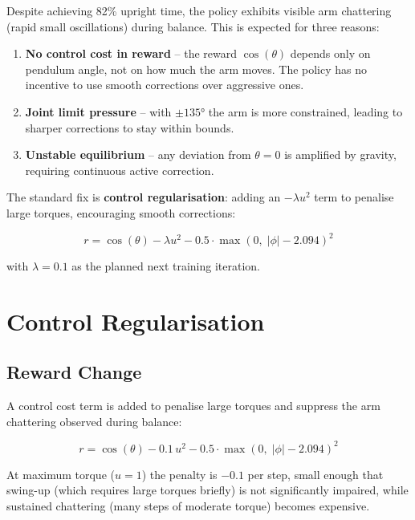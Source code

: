 \documentclass[12pt,a4paper]{article}
\begin{document}
Despite achieving 82\% upright time, the policy exhibits visible arm chattering
(rapid small oscillations) during balance. This is expected for three reasons:

\begin{enumerate}
    \item \textbf{No control cost in reward} -- the reward $\cos(\theta)$
          depends only on pendulum angle, not on how much the arm moves.
          The policy has no incentive to use smooth corrections over aggressive ones.
    \item \textbf{Joint limit pressure} -- with $\pm135°$ the arm is more
          constrained, leading to sharper corrections to stay within bounds.
    \item \textbf{Unstable equilibrium} -- any deviation from $\theta=0$
          is amplified by gravity, requiring continuous active correction.
\end{enumerate}

\noindent The standard fix is \textbf{control regularisation}: adding an
$-\lambda u^2$ term to penalise large torques, encouraging smooth corrections:

\begin{equation}
r = \cos(\theta) - \lambda u^2 - 0.5 \cdot \max(0,\; |\phi| - 2.094)^2
\end{equation}

\noindent with $\lambda = 0.1$ as the planned next training iteration.

\section{Control Regularisation}

\subsection{Reward Change}

A control cost term is added to penalise large torques and suppress the arm
chattering observed during balance:

\begin{equation}
r = \cos(\theta) - 0.1\,u^2 - 0.5 \cdot \max(0,\; |\phi| - 2.094)^2
\end{equation}

At maximum torque ($u = 1$) the penalty is $-0.1$ per step, small enough that
swing-up (which requires large torques briefly) is not significantly impaired,
while sustained chattering (many steps of moderate torque) becomes expensive.
\end{document}
